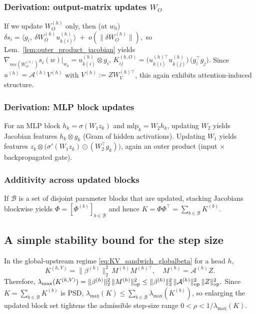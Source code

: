 \documentclass{article}
\theoremstyle{plain}
\theoremstyle{definition}
\theoremstyle{remark}
\begin{document}
\subsubsection{Derivation: output-matrix updates $W_O$}
If we update $W_O^{(h)}$ only, then (at $w_0$)
\(
\delta s_i = \langle g_i,\ \delta W_O^{(h)}u_{k(i)}^{(h)}\rangle \;+\; o(\|\delta W_O^{(h)}\|),
\)
so Lem.~\ref{lem:outer_product_jacobian} yields
\(
\nabla_{\mathrm{vec}(W_O^{(h)})} s_i(w)\big|_{w_0} = u_{k(i)}^{(h)}\otimes g_i,
\,
K_{ij}^{(h,O)} = \bigl(u_{k(i)}^{(h)\top}u_{k(j)}^{(h)}\bigr)\,\bigl(g_i^\top g_j\bigr).
\)
Since $u^{(h)}=\mathcal{A}^{(h)}V^{(h)}$ with $V^{(h)}:=ZW_V^{(h)\top}$, this again exhibits attention-induced structure.

\subsubsection{Derivation: MLP block updates}
For an MLP block $h_k=\sigma(W_1 z_k)$ and $\mathrm{mlp}_k=W_2 h_k$,
updating $W_2$ yields Jacobian features $h_k\otimes g_k$ (Gram of hidden activations).
Updating $W_1$ yields features
$z_k\otimes \bigl(\sigma'(W_1 z_k)\odot (W_2^\top g_k)\bigr)$,
again an outer product (input $\times$ backpropagated gate).

\subsubsection{Additivity across updated blocks}
If $\mathcal{B}$ is a set of disjoint parameter blocks that are updated, stacking Jacobians blockwise yields
$\Phi=[\Phi^{(b)}]_{b\in\mathcal{B}}$ and hence $K=\Phi\Phi^\top=\sum_{b\in\mathcal{B}}K^{(b)}$.






\subsection{A simple stability bound for the step size}
\label{app:sec5_stability}

In the global-upstream regime \eqref{eq:KV_sandwich_globalbeta} for a head $h$,
\[
K^{(h,V)}=\|\beta^{(h)}\|_2^2\, M^{(h)}M^{(h)\top},
\quad M^{(h)}=\mathcal{A}^{(h)}Z.
\]
Therefore,
\(
\lambda_{\max}(K^{(h,V)})=\|\beta^{(h)}\|_2^2\,\|M^{(h)}\|_{\rm op}^2
\le \|\beta^{(h)}\|_2^2\,\|\mathcal{A}^{(h)}\|_{\rm op}^2\,\|Z\|_{\rm op}^2.
\)
Since $K=\sum_{b\in\mathcal B}K^{(b)}$ is PSD, $\lambda_{\max}(K)\le\sum_{b\in\mathcal B}\lambda_{\max}(K^{(b)})$,
so enlarging the updated block set tightens the admissible step-size range $0<\rho<1/\lambda_{\max}(K)$.
\end{document}

